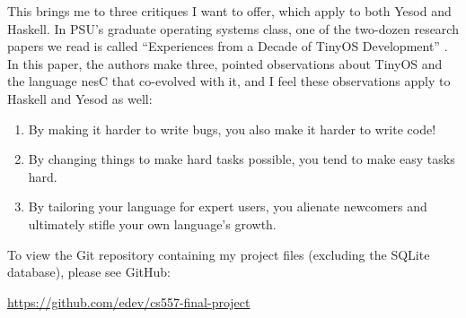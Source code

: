 This brings me to three critiques I want to offer, which apply to both Yesod and Haskell. In PSU's graduate operating systems class, one of the two-dozen research papers we read is called ``Experiences from a Decade of TinyOS Development'' \cite{tinyOS}. In this paper, the authors make three, pointed observations about TinyOS and the language nesC that co-evolved with it, and I feel these observations apply to Haskell and Yesod as well:

\begin{enumerate}
  \item By making it harder to write bugs, you also make it harder to write code!
  \item By changing things to make hard tasks possible, you tend to make easy tasks hard.
  \item By tailoring your language for expert users, you alienate newcomers and ultimately stifle your own language's growth.
\end{enumerate}

To view the Git repository containing my project files (excluding the SQLite database), please see GitHub:

\begin{center}
  \url{https://github.com/edev/cs557-final-project}
\end{center}

